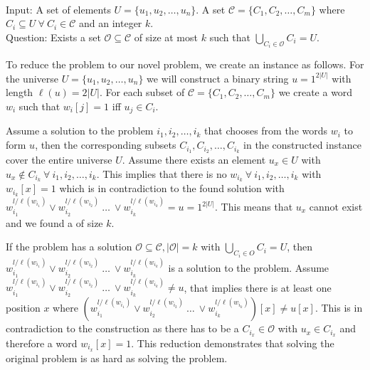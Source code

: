 \begin{defn}{\ \\}
	Input: A set of elements $U = \{u_1, u_2, \dots , u_n\}$. A set $\mathcal{C} = \{C_1, C_2, \dots , C_m\}$ where $C_i \subseteq U ~\forall~ C_i \in \mathcal{C}$ and an integer $k$.\\
	Question: Exists a set $\mathcal{O} \subseteq \mathcal{C}$ of size  at most $k$ such that $\underset{C_i \in \mathcal{O}}{\bigcup}C_i = U$.
\end{defn}
To reduce the {} problem to our novel problem, we create an instance as follows.
For the universe $U = \{u_1, u_2, \dots, u_n\}$ we will construct a binary string $u= 1^{2|U|}$ with length $\ell(u) = 2|U|$. For each subset of $\mathcal{C} = \{C_1, C_2, \dots, C_m\}$ we create a word $w_i$ such that $w_i[j] = 1$ iff $u_j \in C_i$. 

Assume a solution to the {} problem $i_1, i_2, \dots, i_k$ that chooses from the words $w_i$ to form $u$, then the corresponding subsets $C_{i_1}, C_{i_2}, \dots, C_{i_k}$ in the constructed {} instance cover the entire universe $U$.
Assume there exists an element $u_x \in U$ with $u_x \not \in C_{i_k} ~\forall~ i_1, i_2, \dots, i_k$.
This implies that there is no $w_{i_k} ~\forall~ i_1, i_2, \dots, i_k$ with $w_{i_k}[x]=1$ which is in contradiction to the found solution with $w_{i_1}^{l / \ell(w_{i_1})} \lor w_{i_2}^{l / \ell(w_{i_2})} ~\dots~ \lor w_{i_k}^{l / \ell(w_{i_k})} = u = 1^{2|U|}$.
This means that $u_x$ cannot exist and we found a {} of size $k$.

If the {} problem has a solution $\mathcal{O} \subseteq \mathcal{C}, |\mathcal{O}|=k$ with $\bigcup_{C_i \in O} C_i = U$, then $w_{i_1}^{l / \ell(w_{i_1})} \lor w_{i_2}^{l / \ell(w_{i_2})} ~\dots~ \lor w_{i_k}^{l / \ell(w_{i_k})}$ is a solution to the {} problem.
Assume $w_{i_1}^{l / \ell(w_{i_1})} \lor w_{i_2}^{l / \ell(w_{i_2})} ~\dots~ \lor w_{i_k}^{l / \ell(w_{i_k})} \not = u$, that implies there is at least one position $x$ where $(w_{i_1}^{l / \ell(w_{i_1})} \lor w_{i_2}^{l / \ell(w_{i_2})} ~\dots~ \lor w_{i_k}^{l / \ell(w_{i_k})})[x] \not= u[x] $.
This is in contradiction to the construction as there has to be a $C_{i_x} \in \mathcal{O}$ with $u_x \in C_{i_x}$ and therefore a word $w_{i_x}[x]=1$. This reduction demonstrates that solving the original problem is as hard as solving the {} problem.


